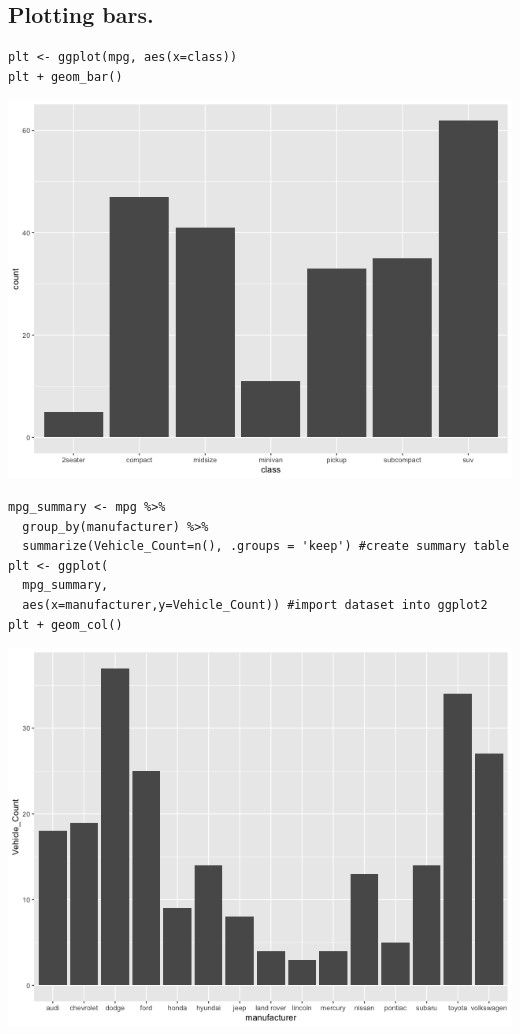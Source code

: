 \documentclass[11pt]{article}
\begin{document}
\subsection{Plotting bars.}
\label{sec:org03f41d9}

\begin{verbatim}
plt <- ggplot(mpg, aes(x=class))
plt + geom_bar()
\end{verbatim}

\begin{org}
\begin{center}
\includegraphics[width=.9\linewidth]{./resources/mpg1.png}
\end{center}
\end{org}

\begin{verbatim}
mpg_summary <- mpg %>%
  group_by(manufacturer) %>%
  summarize(Vehicle_Count=n(), .groups = 'keep') #create summary table
plt <- ggplot(
  mpg_summary,
  aes(x=manufacturer,y=Vehicle_Count)) #import dataset into ggplot2
plt + geom_col()
\end{verbatim}

\begin{org}
\begin{center}
\includegraphics[width=.9\linewidth]{./resources/mpg2.png}
\end{center}
\end{org}
\end{document}
